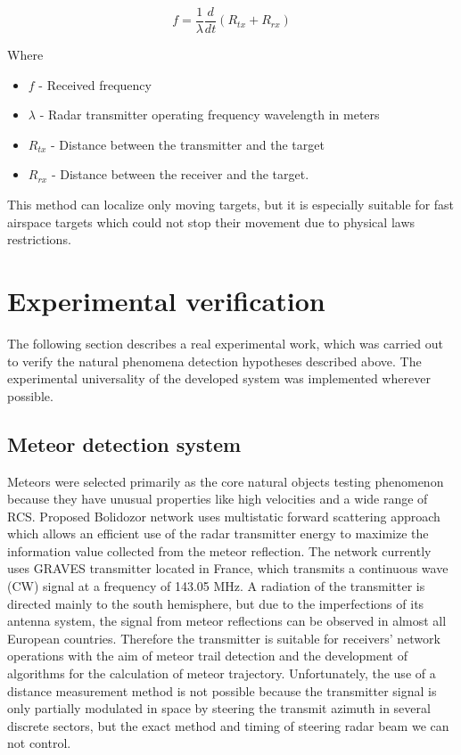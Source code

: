 \documentclass[twoside]{ctuthesis}
\theoremstyle{plain}
\theoremstyle{definition}
\theoremstyle{note}
\begin{document}
\begin{equation}
f = \frac{1}{\lambda} \frac{d}{dt} \left( R_{tx} + R_{rx} \right)
\label{bistatic_doppler}
\end{equation}

Where 
\begin{itemize}
\item $f$ - Received frequency
\item $\lambda$ - Radar transmitter operating frequency wavelength in meters
\item $R_{tx}$ - Distance between the transmitter and the target
\item $R_{rx}$ - Distance between the receiver and the target.
\end{itemize}

This method can localize only moving targets, but it is especially suitable for fast airspace targets which could not stop their movement due to physical laws restrictions. 

\chapter{Experimental verification}

The following section describes a real experimental work, which was carried out to verify the natural phenomena detection hypotheses described above. The experimental universality of the developed system was implemented wherever possible. 

\section{Meteor detection system}

Meteors were selected primarily as the core natural objects testing phenomenon because they have unusual properties like high velocities and a wide range of RCS.
Proposed Bolidozor network \cite{Bolidozor} uses multistatic forward scattering approach which allows an efficient use of the radar transmitter energy to maximize the information value collected from the meteor reflection.
The network currently uses GRAVES \cite{GRAVES_radar} transmitter located in France, which transmits a continuous wave (CW) signal at a frequency of 143.05 MHz. A radiation of the transmitter is directed mainly to the south hemisphere, but due to the imperfections of its antenna system, the signal from meteor reflections can be observed in almost all European countries. Therefore the transmitter is suitable for receivers' network operations with the aim of meteor trail detection and the development of algorithms for the calculation of meteor trajectory. Unfortunately, the use of a distance measurement method is not possible because the transmitter signal is only partially modulated in space by steering the transmit azimuth in several discrete sectors, but the exact method and timing of steering radar beam we can not control. 
\end{document}
